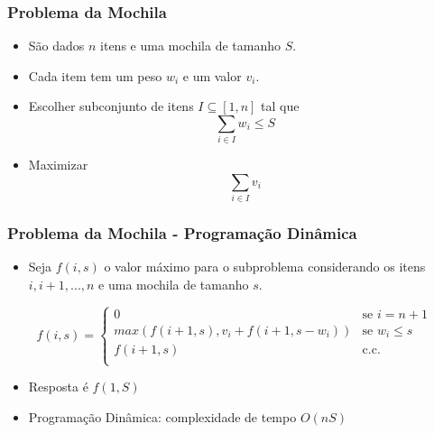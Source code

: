 \documentclass{beamer}
\begin{document}

\begin{frame}
\frametitle{Problema da Mochila}
\begin{itemize}
\item São dados $n$ itens e uma mochila de tamanho $S$.

\item Cada item tem um peso $w_i$ e um valor $v_i$.

\item Escolher subconjunto  de itens $I \subseteq [1, n]$ tal que $$\sum_{i \in I}w_i \leq S$$

\item Maximizar $$\sum_{i \in I}v_i$$
\end{itemize}
\end{frame}


\begin{frame}
\frametitle{Problema da Mochila - Programação Dinâmica}

\begin{itemize}
\item Seja $f(i, s)$ o valor máximo para o subproblema considerando os itens $i, i + 1, ..., n$ e uma mochila de tamanho $s$.
\end{itemize}
 
\begin{equation}
  f(i, s) =
  \begin{cases}
  0                                                             & \text{se $i = n + 1$} \\
  max(f(i + 1, s), v_i + f(i + 1, s - w_i))   & \text{se $w_i \leq s$} \\
  f(i + 1, s)                                          & \text{c.c.} \\
  \end{cases}
\end{equation}

\begin{itemize}
\item Resposta é $f(1, S)$
\item Programação Dinâmica: complexidade de tempo $O(nS)$
\end{itemize}

\end{frame}

\end{document}
